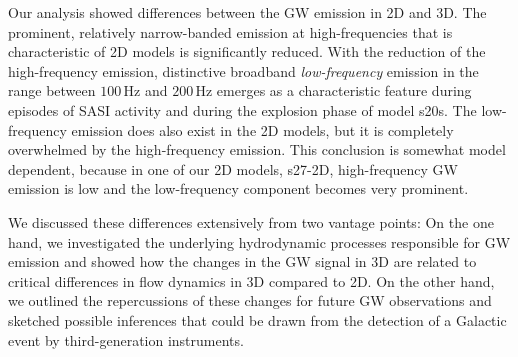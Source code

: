 Our analysis showed differences between the GW emission in 2D and
3D. The prominent, relatively narrow-banded emission at
high-frequencies that is characteristic of 2D models is significantly
reduced. With the reduction of the high-frequency emission,
distinctive broadband \emph{low-frequency} emission in the range between $100 \, \mathrm{Hz}$
and $200 \, \mathrm{Hz}$ emerges as a characteristic feature during
episodes of SASI activity and during the explosion phase of model s20s.
The low-frequency emission does also exist in the 2D models, but it is completely
overwhelmed by the high-frequency emission. 
This conclusion is somewhat model dependent, because in 
one of our 2D models, s27-2D, high-frequency GW emission
is low and the low-frequency component becomes very prominent.

We discussed these differences extensively from two vantage points:
On the one hand, we investigated the underlying hydrodynamic processes
responsible for GW emission and showed how the changes in the GW signal in 3D
are related to critical differences in flow dynamics in 3D compared to 2D.
On the other hand, we outlined the repercussions of these changes
for future GW observations and sketched possible inferences that
could be drawn from the detection of a Galactic event by third-generation
instruments.

